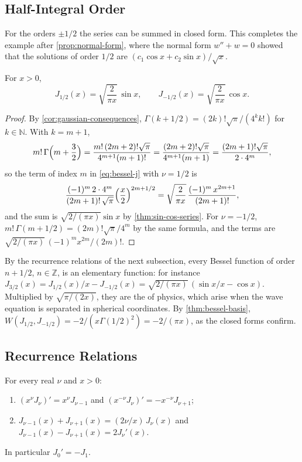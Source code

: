 \subsection{Half-Integral Order}

For the orders $\pm1/2$ the series can be summed in closed form. This completes the example after \cref{prop:normal-form}, where the normal form $w''+w=0$ showed that the solutions of order $1/2$ are $(c_1\cos x+c_2\sin x)/\sqrt x$.

\begin{proposition}
\label{prop:bessel-half}
For $x>0$,
\[
J_{1/2}(x)=\sqrt{\frac2{\pi x}}\,\sin x,\qquad J_{-1/2}(x)=\sqrt{\frac2{\pi x}}\,\cos x .
\]
\end{proposition}

\begin{proof}
By \cref{cor:gaussian-consequences}, $\Gamma(k+1/2)=(2k)!\sqrt\pi/(4^kk!)$ for $k\in\mathbb N$. With $k=m+1$,
\[
m!\,\Gamma\Bigl(m+\frac32\Bigr)=\frac{m!\,(2m+2)!\sqrt\pi}{4^{m+1}(m+1)!}=\frac{(2m+2)!\sqrt\pi}{4^{m+1}(m+1)}=\frac{(2m+1)!\sqrt\pi}{2\cdot4^m},
\]
so the term of index $m$ in \eqref{eq:bessel-j} with $\nu=1/2$ is
\[
\frac{(-1)^m\,2\cdot4^m}{(2m+1)!\,\sqrt\pi}\Bigl(\frac x2\Bigr)^{2m+1/2}=\sqrt{\frac2{\pi x}}\,\frac{(-1)^m\,x^{2m+1}}{(2m+1)!},
\]
and the sum is $\sqrt{2/(\pi x)}\sin x$ by \cref{thm:sin-cos-series}. For $\nu=-1/2$, $m!\,\Gamma(m+1/2)=(2m)!\sqrt\pi/4^m$ by the same formula, and the terms are $\sqrt{2/(\pi x)}\,(-1)^mx^{2m}/(2m)!$.
\end{proof}

By the recurrence relations of the next subsection, every Bessel function of order $n+1/2$, $n\in\mathbb Z$, is an elementary function: for instance $J_{3/2}(x)=J_{1/2}(x)/x-J_{-1/2}(x)=\sqrt{2/(\pi x)}\,(\sin x/x-\cos x)$. Multiplied by $\sqrt{\pi/(2x)}$, they are the  of physics, which arise when the wave equation is separated in spherical coordinates. By \cref{thm:bessel-basis}, $W(J_{1/2},J_{-1/2})=-2/(x\Gamma(1/2)^2)=-2/(\pi x)$, as the closed forms confirm.

\subsection{Recurrence Relations}

\begin{proposition}
\label{prop:bessel-recurrences}
For every real $\nu$ and $x>0$:
\begin{enumerate}
\item $(x^\nu J_\nu)'=x^\nu J_{\nu-1}$ and $(x^{-\nu}J_\nu)'=-x^{-\nu}J_{\nu+1}$;
\item $J_{\nu-1}(x)+J_{\nu+1}(x)=(2\nu/x)\,J_\nu(x)$ and $J_{\nu-1}(x)-J_{\nu+1}(x)=2J_\nu'(x)$.
\end{enumerate}
In particular $J_0'=-J_1$.
\end{proposition}

